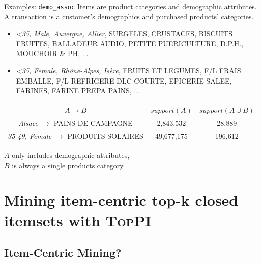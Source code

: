 \documentclass[table]{beamer}
\providecommand{\toppi}{\mbox{\textsc{TopPI}} }
\providecommand{\demoassoc}{\texttt{demo\-\_assoc} }
\begin{document}
\begin{frame}[t]{Examples: \demoassoc}
  Items are product categories and demographic attributes.\\
  A transaction is a customer's demographics and purchased products' categories.\\\vspace{1em}
  \begin{scriptsize}
    \begin{itemize}
      \item {\em <35, Male, Auvergne, Allier}, SURGELES, CRUSTACES, BISCUITS FRUITES, BALLADEUR AUDIO,
        PETITE PUERICULTURE, D.P.H., MOUCHOIR \& PH, ... \\
      \item {\em <35, Female, Rhône-Alpes, Isère}, FRUITS ET LEGUMES, F/L FRAIS EMBALLE, F/L REFRIGERE DLC COURTE,
        EPICERIE SALEE, FARINES, FARINE PREPA PAINS, ... \\
    \end{itemize}
    \begin{table}[t!]
      \def\arraystretch{1.2}
      \begin{tabular}{|c|c|c|}
        \hline
        $A \rightarrow B$       & $\mathit{support}(A)$ & $\mathit{support}(A \cup B)$ \\\hline
        {\em Alsace} $\rightarrow$ PAINS DE CAMPAGNE & 2,843,532 & 28,889  \\
        {\em 35-49, Female} $\rightarrow$  PRODUITS SOLAIRES  & 49,677,175 & 196,612   \\
        \hline
      \end{tabular}
    \end{table}
  \end{scriptsize}
  $A$ only includes demographic attributes,\\
  $B$ is always a single products category.
\end{frame}









\section{Mining item-centric top-k closed itemsets with \toppi}

\subsection{Item-Centric Mining?}
\end{document}
